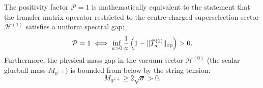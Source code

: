 \begin{theorem}
\label{thm:positivity_reduction}
The positivity factor $\mathcal{P} = 1$ is mathematically equivalent to the statement that the transfer matrix operator restricted to the centre-charged superselection sector $\mathcal{H}^{(1)}$ satisfies a uniform spectral gap:
\begin{equation}
\label{eq:centre_positivity_condition}
\mathcal{P} = 1 \iff \inf_{a > 0} \frac{1}{a} \left( 1 - \|\hat{T}_a^{(1)}\|_{\mathrm{op}} \right) > 0.
\end{equation}
Furthermore, the physical mass gap in the vacuum sector $\mathcal{H}^{(0)}$ (the scalar glueball mass $M_{0^{++}}$) is bounded from below by the string tension:
\begin{equation}
\label{eq:glueball_string_bound_ch8}
M_{0^{++}} \ge 2 \sqrt{\sigma} > 0.
\end{equation}
\end{theorem}

